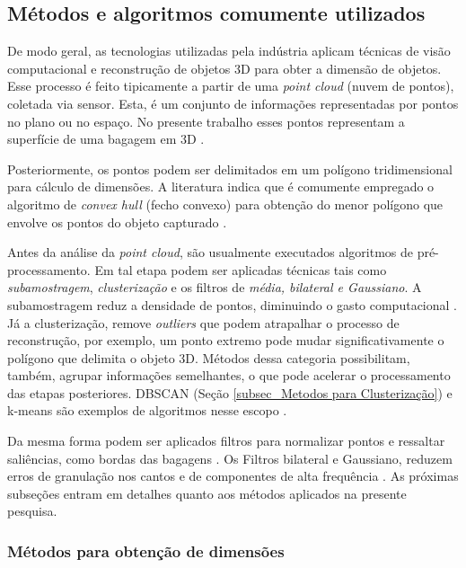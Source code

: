 \subsection{Métodos e algoritmos comumente utilizados}
\label{sec_Metodos e algoritmos comumente utilizados}

    De modo geral, as tecnologias utilizadas pela indústria aplicam técnicas de visão computacional e reconstrução de objetos 3D para obter a dimensão de objetos. Esse processo é feito tipicamente a partir de uma \textit{\textit{point cloud}} (nuvem de pontos), coletada via sensor. Esta, é um conjunto de informações representadas por pontos no plano ou no espaço. No presente trabalho esses pontos representam a superfície de uma bagagem em 3D \cite{chen_2013_research}.
    
    Posteriormente, os pontos podem ser delimitados em um polígono tridimensional para cálculo de dimensões. A literatura indica que é comumente empregado o algoritmo de \textit{convex hull} (fecho convexo) para obtenção do menor polígono que envolve os pontos do objeto capturado \cite{neethu_2015_role, gao_2018_minimum, ding_2018_a}.

    Antes da análise da \textit{point cloud}, são usualmente executados algoritmos de pré-processamento. Em tal etapa podem ser aplicadas técnicas tais como \textit{subamostragem}, \textit{clusterização} e os filtros de \textit{média, bilateral e Gaussiano}. A subamostragem reduz a densidade de pontos, diminuindo o gasto computacional \cite{ruchay_2018_fusion}. Já a clusterização, remove \textit{outliers} que podem atrapalhar o processo de reconstrução, por exemplo, um ponto extremo pode mudar significativamente o polígono que delimita o objeto 3D. Métodos dessa categoria	  possibilitam, também, agrupar informações semelhantes, o que pode acelerar o processamento das etapas posteriores. DBSCAN (Seção \ref{subsec_Metodos para Clusterização}) e k-means são exemplos de algoritmos nesse escopo \cite{limwattanapibool_2017_determination}. 

    Da mesma forma podem ser aplicados filtros para normalizar pontos e ressaltar saliências, como bordas das bagagens \cite{ruchay_2018_fusion}.  Os Filtros bilateral e Gaussiano, reduzem erros de granulação nos cantos e de componentes de alta frequência \cite{shin_2014_implementation, wan_2012_a}. As próximas subseções entram em detalhes quanto aos métodos aplicados na presente pesquisa.

\subsubsection{Métodos para obtenção de dimensões}
\label{subsec_Metodos para obtenção de dimensões}

